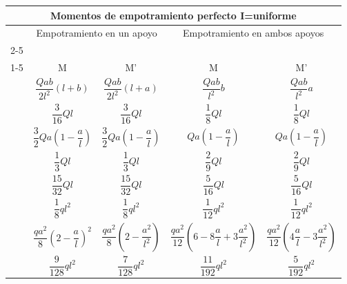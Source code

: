 \newpage
\begin{table}[htb]
	\centering
	\resizebox{.95\textwidth}{!}
	{
		\begin{tabular}{m{4cm}cccc}
			\multicolumn{5}{c}{\Large  \textbf{Momentos de empotramiento perfecto} I=uniforme} \\ \toprule
			& \multicolumn{2}{c}{\large Empotramiento en un apoyo} & \multicolumn{2}{c}{\large Empotramiento en ambos apoyos} \\ \cmidrule{2-5} 
			&   &  & \multicolumn{2}{c}{} \\ \cmidrule{1-5}
			\multicolumn{1}{c}{\large{Cargas}} & \large{M} & \large{M'} & \large{M} & \large{M'} \\ \midrule
			 & \large{$\dfrac{Qab}{2l^2}(l+b)$} &  \large{$\dfrac{Qab}{2l^2}(l+a)$} & \large{$\dfrac{Qab}{l^2}b$} & \large{$\dfrac{Qab}{l^2}a$} \\ \midrule
			 & \large{$\dfrac{3}{16}Ql$} & \large{$\dfrac{3}{16}Ql$} & \large{$\dfrac{1}{8}Ql$} & \large{$\dfrac{1}{8}Ql$} \\ \midrule
			 & \large{$\dfrac{3}{2}Qa\left(1-\dfrac{a}{l}\right)$} & \large{$\dfrac{3}{2}Qa\left(1-\dfrac{a}{l}\right)$} & \large{$Qa\left(1-\dfrac{a}{l}\right)$} & \large{$Qa\left(1-\dfrac{a}{l}\right)$} \\ \midrule
			 & \large{$\dfrac{1}{3}Ql$} & \large{$\dfrac{1}{3}Ql$} & \large{$\dfrac{2}{9}Ql$} & \large{$\dfrac{2}{9}Ql$} \\ \midrule
			 & \large{$\dfrac{15}{32}Ql$} & \large{$\dfrac{15}{32}Ql$} & \large{$\dfrac{5}{16}Ql$} & \large{$\dfrac{5}{16}Ql$} \\ \midrule
			 & \large{$\dfrac{1}{8}ql^2$} & \large{$\dfrac{1}{8}ql^2$} & \large{$\dfrac{1}{12}ql^2$} & \large{$\dfrac{1}{12}ql^2$} \\ \midrule
			 & \large{$\dfrac{qa^2}{8}\left(2-\dfrac{a}{l}\right)^2$} & \large{$\dfrac{qa^2}{8}\left(2-\dfrac{a^2}{l^2}\right)$} & \large{$\dfrac{qa^2}{12}\left(6-8\dfrac{a}{l}+3\dfrac{a^2}{l^2}\right)$} & \large{$\dfrac{qa^2}{12}\left(4\dfrac{a}{l}-3\dfrac{a^2}{l^2}\right)$} \\ \midrule
			 & \large{$\dfrac{9}{128}ql^2$} & \large{$\dfrac{7}{128}ql^2$} & \large{$\dfrac{11}{192}ql^2$} & \large{$\dfrac{5}{192}ql^2$} \\ \midrule

\end{tabular}}
\end{table}
